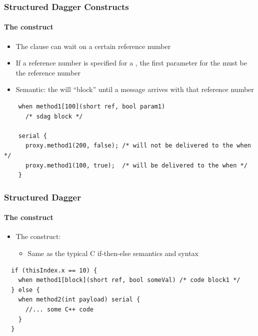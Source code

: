 
\begin{frame}[fragile]
  \frametitle{Structured Dagger Constructs}
  \framesubtitle{The  construct}
  \begin{itemize}
    \item The  clause can wait on a certain reference number
    \item If a reference number is specified for a , the first
      parameter for the  must be the reference number
    \item Semantic: the  will ``block'' until a message arrives with
      that reference number
  \end{itemize}
  \begin{lstlisting}
    when method1[100](short ref, bool param1)
      /* sdag block */

    serial {
      proxy.method1(200, false); /* will not be delivered to the when */
      proxy.method1(100, true);  /* will be delivered to the when */
    }
  \end{lstlisting}
\end{frame}

\begin{frame}[fragile]
  \frametitle{Structured Dagger}
  \framesubtitle{The  construct}
  \begin{itemize}
  \item The  construct:
    \begin{itemize}
    \item Same as the typical C if-then-else semantics and syntax
    \end{itemize}
  \end{itemize}
  \begin{lstlisting}
  if (thisIndex.x == 10) {
    when method1[block](short ref, bool someVal) /* code block1 */
  } else {
    when method2(int payload) serial {
      //... some C++ code
    }
  }
  \end{lstlisting}
\end{frame}

